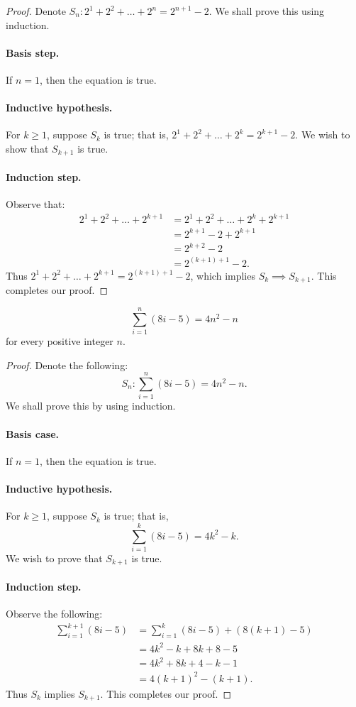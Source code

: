 \documentclass{exam}
\begin{document}
\begin{proof}
    Denote $S_n:2^1+2^2+\dots+2^n=2^{n+1}-2$. We shall prove this using induction.
    \paragraph{Basis step.} If $n = 1$, then the equation is true.
    \paragraph{Inductive hypothesis.} For $k \ge 1$, suppose $S_k$ is true; that is, $2^1+2^2+\dots+2^k=2^{k+1}-2$. We wish to show that $S_{k+1}$ is true.
    \paragraph{Induction step.} Observe that:
    \begin{align*}
        2^1+2^2+\dots+2^{k+1} &= 2^1 + 2^2 +\dots + 2^k + 2^{k+1}\\
        &=2^{k+1}-2+2^{k+1}\\
        &=2^{k+2}-2\\
        &=2^{(k+1)+1}-2.
    \end{align*}
    Thus $2^1+2^2+\dots+2^{k+1}=2^{(k+1)+1}-2$, which implies $S_k\implies S_{k+1}$. This completes our proof.
\end{proof}

\begin{proposition}{10.6}
    $$\sum_{i=1}^n(8i-5)=4n^2-n$$ for every positive integer $n$.
\end{proposition}

\begin{proof}
    Denote the following: $$S_n:\sum_{i=1}^n(8i-5)=4n^2-n.$$ We shall prove this by using induction.
    \paragraph{Basis case.} If $n=1$, then the equation is true.
    \paragraph{Inductive hypothesis.} For $k\ge1$, suppose $S_k$ is true; that is, $$\sum_{i=1}^k(8i-5)=4k^2-k.$$ We wish to prove that $S_{k+1}$ is true.
    \paragraph{Induction step.} Observe the following:
    \begin{align*}
        \sum_{i=1}^{k+1}(8i-5)&=\sum_{i=1}^k(8i-5) + (8(k+1)-5)\\
        &=4k^2-k+8k+8-5\\
        &=4k^2+8k+4-k-1\\
        &=4(k+1)^2-(k+1).
    \end{align*}
    Thus $S_k$ implies $S_{k+1}$. This completes our proof.
\end{proof}
\end{document}
